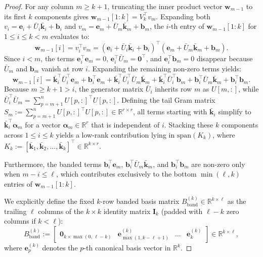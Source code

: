 \documentclass[a4paper,fleqn]{cas-sc}
\begin{document}
\begin{proof}
For any column $m \ge k+1$, truncating the inner product vector $\mathbf{w}_{m-1}$ to its first $k$ components gives $\mathbf{w}_{m-1}[1:k] = V_k^\top v_m$. Expanding both $v_i = \mathbf{e}_i + \bar{U}_i \bar{\mathbf{k}}_i + \mathbf{b}_i$ and $v_m = \mathbf{e}_m + \bar{U}_m \bar{\mathbf{k}}_m + \mathbf{b}_m$, the $i$-th entry of $\mathbf{w}_{m-1}[1:k]$ for $1 \le i \le k < m$ evaluates to:
\[
\mathbf{w}_{m-1}[i] = v_i^\top v_m = (\mathbf{e}_i + \bar{U}_i \bar{\mathbf{k}}_i + \mathbf{b}_i)^\top (\mathbf{e}_m + \bar{U}_m \bar{\mathbf{k}}_m + \mathbf{b}_m).
\]
Since $i < m$, the terms $\mathbf{e}_i^\top \mathbf{e}_m = 0$, $\mathbf{e}_i^\top \bar{U}_m = \mathbf{0}^\top$, and $\mathbf{e}_i^\top \mathbf{b}_m = 0$ disappear because $\bar{U}_m$ and $\mathbf{b}_m$ vanish at row $i$. Expanding the remaining non-zero terms yields:
\[
\mathbf{w}_{m-1}[i] = \bar{\mathbf{k}}_i^\top \bar{U}_i^\top \mathbf{e}_m + \mathbf{b}_i^\top \mathbf{e}_m + \bar{\mathbf{k}}_i^\top \bar{U}_i^\top \bar{U}_m \bar{\mathbf{k}}_m + \bar{\mathbf{k}}_i^\top \bar{U}_i^\top \mathbf{b}_m + \mathbf{b}_i^\top \bar{U}_m \bar{\mathbf{k}}_m + \mathbf{b}_i^\top \mathbf{b}_m.
\]
Because $m \ge k+1 > i$, the generator matrix $\bar{U}_i$ inherits row $m$ as $U[m, :]$, while $\bar{U}_i^\top \bar{U}_m = \sum_{p=m+1}^n U[p, :]^\top U[p, :]$. Defining the tail Gram matrix $S_m := \sum_{p=m+1}^n U[p, :]^\top U[p, :] \in \mathbb{R}^{r \times r}$, all terms starting with $\bar{\mathbf{k}}_i$ simplify to $\bar{\mathbf{k}}_i^\top \boldsymbol{\alpha}_m$ for a vector $\boldsymbol{\alpha}_m \in \mathbb{R}^r$ that is independent of $i$. Stacking these $k$ components across $1 \le i \le k$ yields a low-rank contribution lying in $\text{span}(K_k)$, where $K_k := [\bar{\mathbf{k}}_1, \bar{\mathbf{k}}_2, \dots, \bar{\mathbf{k}}_k]^\top \in \mathbb{R}^{k \times r}$. 

Furthermore, the banded terms $\mathbf{b}_i^\top \mathbf{e}_m$, $\mathbf{b}_i^\top \bar{U}_m \bar{\mathbf{k}}_m$, and $\mathbf{b}_i^\top \mathbf{b}_m$ are non-zero only when $m - i \le \ell$, which contributes exclusively to the bottom $\min(\ell, k)$ entries of $\mathbf{w}_{m-1}[1:k]$.

We explicitly define the fixed $k$-row banded basis matrix $B_{\text{band}}^{(k)} \in \mathbb{R}^{k \times \ell}$ as the trailing $\ell$ columns of the $k \times k$ identity matrix $\mathbf{I}_k$ (padded with $\ell - k$ zero columns if $k < \ell$):
\[
B_{\text{band}}^{(k)} := \begin{bmatrix} \mathbf{0}_{k \times \max(0, \, \ell-k)} & \mathbf{e}_{\max(1, k-\ell+1)}^{(k)} & \dots & \mathbf{e}_k^{(k)} \end{bmatrix} \in \mathbb{R}^{k \times \ell},
\]
where $\mathbf{e}_p^{(k)}$ denotes the $p$-th canonical basis vector in $\mathbb{R}^k$.


\end{proof}
\end{document}
